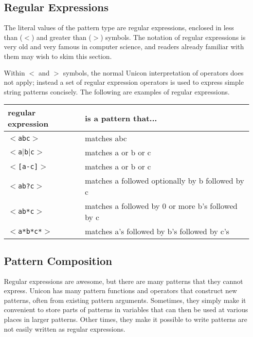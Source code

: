 \subsection{Regular Expressions}

The literal values of the pattern type are regular expressions,
enclosed in less than ($<$) and greater than ($>$) symbols. The
notation of regular expressions is very old and very famous in
computer science, and readers already familiar with them may wish
to skim this section.

Within $<$ and $>$ symbols, the normal Unicon interpretation of
operators does not apply; instead a set of regular expression
operators is used to express simple string patterns concisely.  The
following are examples of regular expressions.

\bigskip

\begin{tabular}{|l|l|} \hline
regular expression	& is a pattern that... \\ \hline
\texttt{$<$abc$>$}	& matches abc \\
\texttt{$<$a$|$b$|$c$>$}& matches a or b or c \\
\texttt{$<$[a-c]$>$}	& matches a or b or c \\
\texttt{$<$ab?c$>$}	& matches a followed optionally by b followed by c \\
\texttt{$<$ab*c$>$}	& matches a followed by 0 or more b's followed by c \\
\texttt{$<$a*b*c*$>$}	& matches a's followed by b's followed by c's \\ \hline
\end{tabular}

\subsection{Pattern Composition}

Regular expressions are awesome, but there are many patterns that they
cannot express. Unicon has many pattern functions and operators that
construct new patterns, often from existing pattern
arguments. Sometimes, they simply make it convenient to store parts of
patterns in variables that can then be used at various places in
larger patterns. Other times, they make it possible to write patterns
are not easily written as regular expressions.

\bigskip

